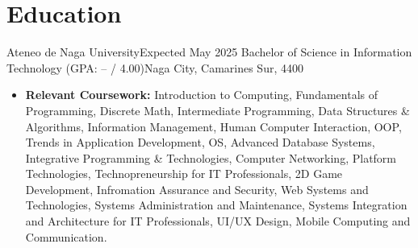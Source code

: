 \section{Education}

\resumeSubHeadingListStart
    \resumeSubheading
    {Ateneo de Naga University}{Expected May 2025}
    {Bachelor of Science in Information Technology (GPA: -- / 4.00)}{Naga City, Camarines Sur, 4400}
    \begin{itemize}
        \item \textbf{Relevant Coursework:} Introduction to Computing, Fundamentals of Programming, Discrete Math, Intermediate Programming, Data Structures \& Algorithms, Information Management, Human Computer Interaction, OOP, Trends in Application Development, OS, Advanced Database Systems, Integrative Programming \& Technologies, Computer Networking, Platform Technologies, Technopreneurship for IT Professionals, 2D Game Development, Infromation Assurance and Security, Web Systems and Technologies, Systems Administration and Maintenance, Systems Integration and Architecture for IT Professionals, UI/UX Design, Mobile Computing and Communication.
    \end{itemize}
\resumeSubHeadingListEnd
